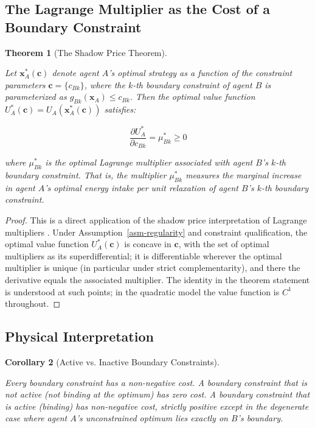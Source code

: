 \documentclass[11pt]{article}
\theoremstyle{plain}
\newtheorem{theorem}{Theorem}
\newtheorem{corollary}[theorem]{Corollary}
\theoremstyle{definition}
\theoremstyle{remark}
\let\origsubsection\subsection
\renewcommand{\subsection}{\needspace{7\baselineskip}\origsubsection}
\begin{document}
\subsection{The Lagrange Multiplier as the Cost of a Boundary
Constraint}\label{the-lagrange-multiplier-as-the-cost-of-a-boundary-constraint}

\begin{theorem}[The Shadow Price Theorem]
\label{thm-shadow-price}

Let $\mathbf{x}_A^*(\boldsymbol{c})$ denote agent $A$'s optimal strategy as a function of the constraint parameters $\boldsymbol{c} = \{c_{Bk}\}$, where the $k$-th boundary constraint of agent $B$ is parameterized as $g_{Bk}(\mathbf{x}_A) \leq c_{Bk}$. Then the optimal value function $U_A^*(\boldsymbol{c}) = U_A(\mathbf{x}_A^*(\boldsymbol{c}))$ satisfies:

$$\frac{\partial U_A^*}{\partial c_{Bk}} = \mu_{Bk}^* \geq 0$$

where $\mu_{Bk}^*$ is the optimal Lagrange multiplier associated with agent $B$'s $k$-th boundary constraint. That is, the multiplier $\mu_{Bk}^*$ measures the marginal increase in agent $A$'s optimal energy intake per unit relaxation of agent $B$'s $k$-th boundary constraint.
\end{theorem}

\begin{proof}
This is a direct application of the shadow price interpretation of Lagrange multipliers \citep[see][§5.6.3]{Boyd2004}. Under Assumption~\ref{asm-regularity} and constraint qualification, the optimal value function $U_A^*(\boldsymbol{c})$ is concave in $\boldsymbol{c}$, with the set of optimal multipliers as its superdifferential; it is differentiable wherever the optimal multiplier is unique (in particular under strict complementarity), and there the derivative equals the associated multiplier. The identity in the theorem statement is understood at such points; in the quadratic model the value function is $C^1$ throughout.
\end{proof}

\subsection{Physical Interpretation}\label{physical-interpretation}

\begin{corollary}[Active vs. Inactive Boundary Constraints]
\label{cor-active-inactive-constraints}

Every boundary constraint has a non-negative cost. A boundary constraint that is not active (not binding at the optimum) has zero cost. A boundary constraint that is active (binding) has non-negative cost, strictly positive except in the degenerate case where agent $A$'s unconstrained optimum lies exactly on $B$'s boundary.
\end{corollary}
\end{document}
